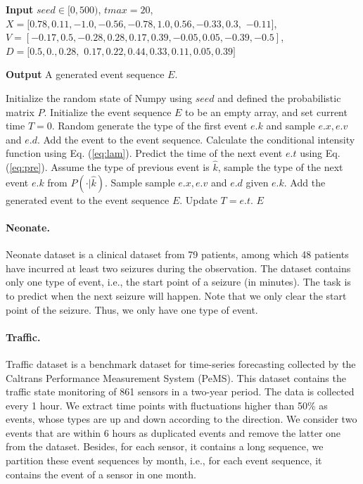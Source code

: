 \begin{algorithm}
\caption{Generate Synthetic Dataset with Time-Aware Dynamic Kernel}
\label{algo:gen}
\begin{algorithmic} 
\STATE \textbf{Input} $\textit{seed} \in [0, 500)$, $\textit{tmax}=20$, $X = [0.78, 0.11, -1.0, -0.56, -0.78, 1.0, 0.56, -0.33, 0.3, $ $-0.11]$, $V=[-0.17, 0.5, -0.28, 0.28, 0.17, 0.39, -0.05, 0.05, -0.39, -0.5]$, $D=[0.5, 0., 0.28, $ $ 0.17, 0.22, 0.44, 0.33, 0.11, 0.05, 0.39]$ 

\STATE \textbf{Output} A generated event sequence $E$. 

\STATE Initialize the random state of Numpy using $\textit{seed}$ and defined the probabilistic matrix $P$.  
\STATE Initialize the event sequence $E$ to be an empty array, and set current time $T=0$.
\STATE Random generate the type of the first event $e.k$ and sample $e.x, e.v$ and $e.d$.
\STATE Add the event to the event sequence.
    \STATE Calculate the conditional intensity function using Eq. (\ref{eq:lam}).
    \STATE Predict the time of the next event $e.t$ using Eq. (\ref{eq:pre}).
    \STATE Assume the type of previous event is $\hat{k}$, sample the type of the next event $e.k$ from $P(\cdot | \hat{k})$.
    \STATE Sample sample $e.x, e.v$ and $e.d$ given $e.k$.
    \STATE Add the generated event to the event sequence $E$.
    \STATE Update $T=e.t$.
\ENDWHILE
\RETURN $E$
\end{algorithmic}
\end{algorithm}

\paragraph{Neonate.} Neonate dataset is a clinical dataset from 79 patients, among which 48 patients have incurred at least two seizures during the observation. The dataset contains only one type of event, i.e., the start point of a seizure (in minutes). The task is to predict when the next seizure will happen. Note that we only clear the start point of the seizure. Thus, we only have one type of event.

\paragraph{Traffic.} Traffic dataset is a benchmark dataset for time-series forecasting collected by the Caltrans Performance Measurement System (PeMS). This dataset contains the traffic state monitoring of 861 sensors in a two-year period. The data is collected every 1 hour. We extract time points with fluctuations higher than 50\% as events, whose types are up and down according to the direction. We consider two events that are within 6 hours as duplicated events and remove the latter one from the dataset. Besides, for each sensor, it contains a long sequence, we partition these event sequences by month, i.e., for each event sequence, it contains the event of a sensor in one month.

